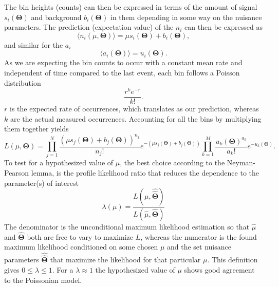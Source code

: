 The bin heights (counts) can then be expressed in terms of the amount of signal $s_i(\bm{\Theta})$ and background $b_i(\bm{\Theta})$ in them depending in some way on the nuisance parameters. The prediction (expectation value) of the $n_i$ can then be expressed as
\begin{equation} \label{eq:n_i}
    \langle n_i(\mu,\bm{\Theta})\rangle = \mu s_i(\bm{\Theta}) +b_i(\bm{\Theta}), 
\end{equation}
and similar for the $a_i$
\begin{equation} \label{eq:a_i}
    \langle a_i(\bm{\Theta}) \rangle = u_i(\bm{\Theta}).
\end{equation}
As we are expecting the bin counts to occur with a constant mean rate and independent of time compared to the last event, each bin follows a Poisson distribution
\begin{equation}\label{eq:poisson}
    \frac{r^k e^{-r}}{k!}.
\end{equation}
$r$ is the expected rate of occurrences, which translates as our prediction, whereas $k$ are the actual measured occurrences. Accounting for all the bins by multiplying them together yields
\begin{equation}\label{eq:likelihood}
    L(\mu,\bm{\Theta})=
    \prod_{j=1}^N \frac{(\mu s_j(\bm{\Theta}) + b_j(\bm{\Theta}))^{n_j}}{n_j !} e^{-(\mu s_j(\bm{\Theta}) + b_j(\bm{\Theta}))}
    \prod_{k=1}^M \frac{u_k(\bm{\Theta})^{a_k}}{a_k!} e^{-u_k(\bm{\Theta})}.
\end{equation}
To test for a hypothesized value of $\mu$, the best choice according to the Neyman-Pearson lemma, is the profile likelihood ratio that reduces the dependence to the parameter(s) of interest
\begin{equation}
\lambda(\mu)=
    \frac{L(\mu,\hat{\hat{\bm{\Theta}}})}
    {L(\hat{\mu},\hat{\bm{\Theta}})}
\end{equation}
The denominator is the unconditional maximum likelihood estimation so that $\hat{\mu}$ and $\hat{\bm{\Theta}}$ both are free to vary to maximize $L$, whereas the numerator is the found maximum likelihood conditioned on some chosen $\mu$ and the set nuisance parameters $\hat{\hat{\bm{\Theta}}}$ that maximize the likelihood for that particular $\mu$. This definition gives $0 \leq \lambda \leq 1$. For a $\lambda \approx 1$ the hypothesized value of $\mu$ shows good agreement to the Poissonian model.

